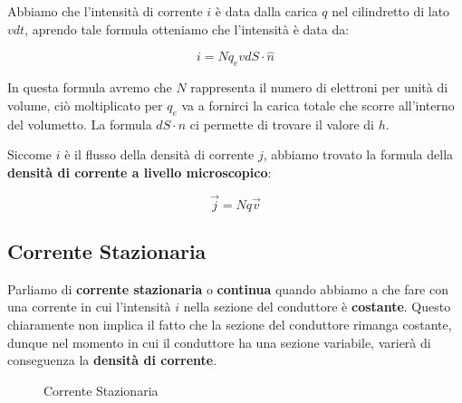 Abbiamo che l'intensità di corrente $i$ è data dalla carica $q$ nel cilindretto di lato $v dt$, aprendo tale formula otteniamo che l'intensità è data da: 

\begin{large}
	\begin{equation}
		i = Nq_evdS \cdot \hat{n}
	\end{equation}
\end{large}

In questa formula avremo che $N$ rappresenta il numero di elettroni per unità di volume, ciò moltiplicato per $q_e$ va a fornirci la carica totale che scorre all'interno del volumetto. La formula $dS \cdot \hat{n}$ ci permette di trovare il valore di $h$. 

Siccome $i $ è il flusso della densità di corrente $j$, abbiamo trovato la formula della \textbf{densità di corrente a livello microscopico}: 

\begin{large}
	\begin{equation}
		\vec{j} = Nq\vec{v}
	\end{equation}
\end{large}

\subsection{Corrente Stazionaria}
Parliamo di \textbf{corrente stazionaria} o \textbf{continua} quando abbiamo a che fare con una corrente in cui l'intensità $i$ nella sezione del conduttore è \textbf{costante}.  Questo chiaramente non implica il fatto che la sezione del conduttore rimanga costante, dunque nel momento in cui il conduttore ha una sezione variabile, varierà di conseguenza la \textbf{densità di corrente}.

\begin{figure}[ht]
	\centering
	\caption{Corrente Stazionaria}
\end{figure}

